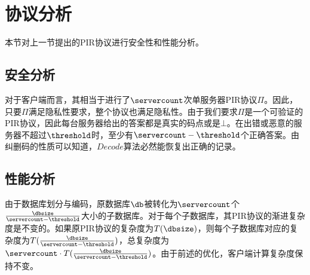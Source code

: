 \section{协议分析}
本节对上一节提出的PIR协议进行安全性和性能分析。

\subsection{安全分析}
对于客户端而言，其相当于进行了$\servercount$次单服务器PIR协议$\Pi$。因此，只要$\Pi$满足隐私性要求，整个协议也满足隐私性。由于我们要求$\Pi$是一个可验证的PIR协议，因此每台服务器给出的答案都是真实的码点或是$\bot$。在出错或恶意的服务器不超过$\threshold$时，至少有$\servercount-\threshold$个正确答案。由纠删码的性质可以知道，$Decode$算法必然能恢复出正确的记录。

\subsection{性能分析}
由于数据库划分与编码，原数据库$\db$被转化为$\servercount$个$\frac{\dbsize}{\servercount-\threshold}$大小的子数据库。对于每个子数据库，其PIR协议的渐进复杂度是不变的。如果原PIR协议的复杂度为$T(\dbsize)$，则每个子数据库对应的复杂度为$T(\frac{\dbsize}{\servercount-\threshold})$，总复杂度为$\servercount \cdot T(\frac{\dbsize}{\servercount-\threshold})$。由于前述的优化，客户端计算复杂度保持不变。